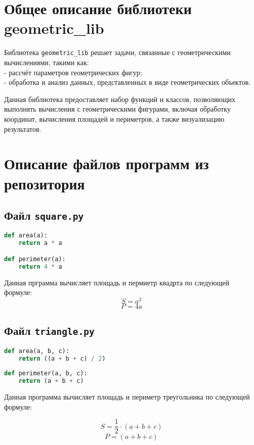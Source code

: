 \documentclass[a4paper,12pt]{article}
\begin{document}


\tableofcontents
\newpage

\section{Общее описание библиотеки geometric\_lib}
Библиотека \texttt{geometric\_lib} решает задачи, связанные с геометрическими вычислениями, такими как:
\\- рассчёт параметров геометрических фигур;
\\- обработка и анализ данных, представленных в виде геометрических объектов.

Данная библиотека предоставляет набор функций и классов, позволяющих выполнять вычисления с геометрическими фигурами, включая обработку координат, вычисления площадей и периметров, а также визуализацию результатов.
\\
\section{Описание файлов программ из репозитория}
\subsection{Файл \texttt{square.py}}
\begin{lstlisting}[language=Python]
def area(a):
    return a * a

def perimeter(a):
    return 4 * a
\end{lstlisting}

Данная прграмма вычисляет площадь и пермиетр квадрта по следующей формуле:
\[
S = a^2
\]
\[
P = 4 a
\]

\subsection{Файл \texttt{triangle.py}}
\begin{lstlisting}[language=Python]
def area(a, b, c):
    return ((a + b + c) / 2)
    
def perimeter(a, b, c):
    return (a + b + c)
\end{lstlisting}

Данная программа вычисляет площадь и периметр треугольника по следующей формуле:

\[
S = \frac{1}{2} \cdot (a + b + c)
\]
\[
P = (a + b + c)
\]
\end{document}
